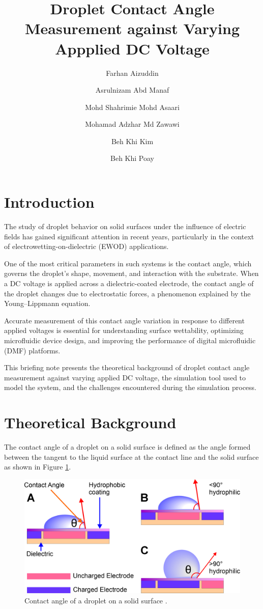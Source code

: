\documentclass[9pt,a4paper,twocolumn,twoside]{tau-class/tau}
\title{Droplet Contact Angle Measurement against Varying Appplied DC Voltage}
\author[1,a]{Farhan Aizuddin}
\author[2,a]{Asrulnizam Abd Manaf}
\author[3,b]{Mohd Shahrimie Mohd Asaari}
\author[4,b]{Mohamad Adzhar Md Zawawi}
\author[5,a]{Beh Khi Kim}
\author[6,c]{Beh Khi Poay}
\affil[a]{CEDEC}
\affil[b]{SEEE}
\affil[c]{Physics}
\begin{document}
    \maketitle
    \thispagestyle{firststyle}
    \tauabstract


\section{Introduction}

The study of droplet behavior on solid surfaces under the influence of electric fields has gained significant attention in recent years, particularly in the context of electrowetting-on-dielectric (EWOD) applications.

One of the most critical parameters in such systems is the contact angle, which governs the droplet’s shape, movement, and interaction with the substrate. When a DC voltage is applied across a dielectric-coated electrode, the contact angle of the droplet changes due to electrostatic forces, a phenomenon explained by the Young–Lippmann equation.

Accurate measurement of this contact angle variation in response to different applied voltages is essential for understanding surface wettability, optimizing microfluidic device design, and improving the performance of digital microfluidic (DMF) platforms.

This briefing note presents the theoretical background of droplet contact angle measurement against varying applied DC voltage, the simulation tool used to model the system, and the challenges encountered during the simulation process.

\section{Theoretical Background}

The contact angle of a droplet on a solid surface is defined as the angle formed between the tangent to the liquid surface at the contact line and the solid surface as shown in Figure \ref{contactangle}.
\begin{figure}[h!]
    \centering
    \includegraphics[width=\columnwidth]{ContactAngle.png}
    \caption{Contact angle of a droplet on a solid surface \cite{kothamachuRoleDigitalMicrofluidics2020}.}
    \label{contactangle}
\end{figure}
\end{document}
